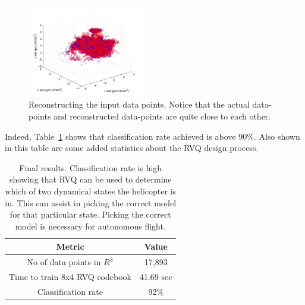 \documentclass{article}
\begin{document}
\begin{figure}[t]
\centering	
\includegraphics[width=0.45\textwidth]{figs/paper_10_ICAI2013_RVQreconstruction.pdf}
\caption{Reconstructing the input data points.  Notice that the actual data-points and reconstructed data-points are quite close to each other.} 
\label{fig:RVQrecon}				
\end{figure}

Indeed, Table~\ref{tbl:Results} shows that classification rate achieved is above 90\%.  Also shown in this table are some added statistics about the RVQ design process.

\begin{table}[h]
\center
\begin{tabular}{|c |c |}\hline
Metric & Value\\\hline
No of data points in $R^3$ & 17,893\\\hline
Time to train 8x4 RVQ codebook & 41.69 sec\\\hline
Classification rate & 92\% \\\hline
\end{tabular}
\caption{Final results.  Classification rate is high showing that RVQ can be used to determine which of two dynamical states the helicopter is in.  This can assist in picking the correct model for that particular state.  Picking the correct model is necessary for autonomous flight.}
\label{tbl:Results}
\end{table}
\end{document}
